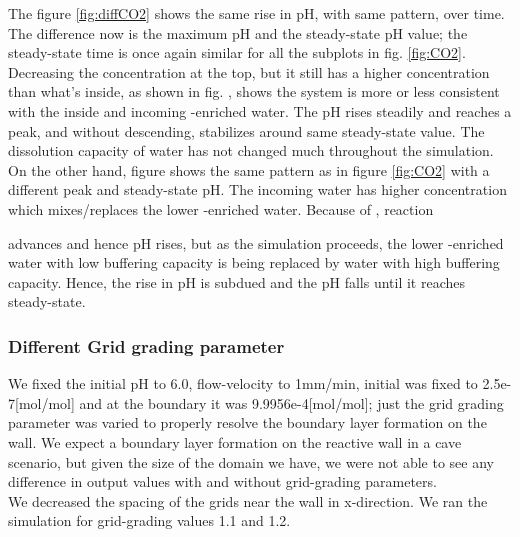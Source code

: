 The figure \ref{fig:diffCO2} shows the same rise in pH, with same pattern, over time. The difference now is the maximum pH 
and the steady-state pH value; the steady-state time is once again similar for all the subplots in fig. \ref{fig:CO2}. 
Decreasing the  concentration at the top, but it still has a higher  concentration than what's inside, as 
shown in fig. , shows the system is more or less consistent with the inside and incoming -enriched water. 
The pH rises steadily and reaches a peak, and without descending, stabilizes around same steady-state value. The dissolution capacity of 
water has not changed much throughout the simulation.\\
On the other hand, figure  shows the same pattern as in figure \ref{fig:CO2} with a different peak and steady-state pH. 
The incoming water has higher  concentration which mixes/replaces the lower -enriched water. Because of , reaction 

advances and hence pH rises, but as the simulation proceeds, the lower -enriched water with low buffering capacity is being replaced 
by water with high buffering capacity. Hence, the rise in pH is subdued and the pH falls until it reaches steady-state. 


\subsubsection*{Different Grid grading parameter} \label{ssec:diffGrid}
We fixed the initial pH to 6.0, flow-velocity to 1mm/min, initial  was fixed to 2.5e-7[mol/mol] and at the boundary it was 
9.9956e-4[mol/mol]; just the grid grading parameter was varied to properly resolve the boundary layer formation on the wall. 
We expect a boundary layer formation on the reactive wall in a cave scenario, but given the size of the domain we have, we were 
not able to see any difference in output values with and without grid-grading parameters. \\
We decreased the spacing of the grids near the wall in x-direction. We ran the simulation for grid-grading values 1.1 and 1.2.


